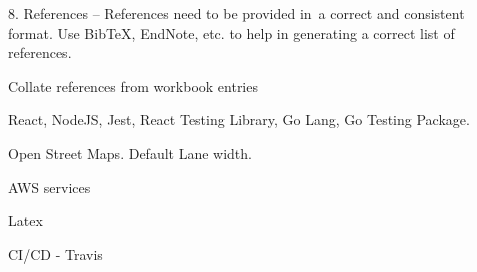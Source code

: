 \documentclass[a4paper,11pt]{article}
\begin{document}

8. References – References need to be provided in a correct and consistent format. Use BibTeX, EndNote, etc. to help in generating a correct list of references.


Collate references from workbook entries

React, NodeJS, Jest, React Testing Library, Go Lang, Go Testing Package.

Open Street Maps.
Default Lane width.


AWS services

Latex

CI/CD - Travis
\end{document}
